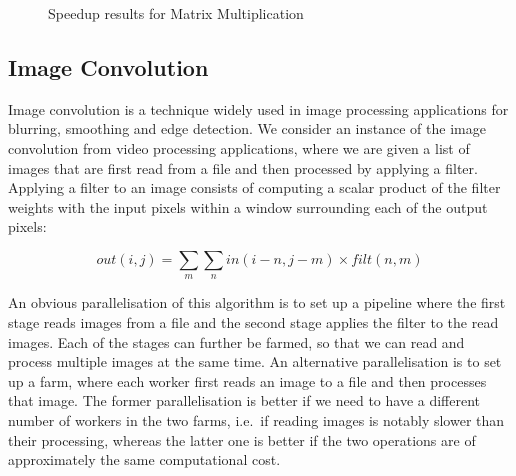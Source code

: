 \begin{figure}[t]
  \centering
{}
 \caption{Speedup results for Matrix Multiplication}
\label{fig:matmult_results}
\end{figure}


\subsection{Image Convolution}

Image convolution is a technique widely used in image processing applications for
blurring, smoothing and edge detection. We consider an instance of the image
convolution from video processing applications, where we are given a list of images
that are first read from a file and then processed by applying 
a filter. Applying a filter to an image consists of computing a scalar
product of the filter weights with the input pixels within a window surrounding each of
the output pixels:


\begin{equation}\label{eqn:01}
\textit{out}(i,j)=\sum_{m}\sum_{n} \textit{in}(i-n,j-m)\times \textit{filt}(n,m)
\end{equation}

\noindent
An obvious parallelisation of this algorithm is to set up a pipeline where the first stage reads images from a file and the second stage applies the filter to the read images. Each of the stages can further be farmed, so that we can read and process multiple images at the same time. An alternative parallelisation is to set up a farm, where each worker first reads an image to a file and then processes that image. The former parallelisation is better if we need to have a different number of workers in the two farms, i.e.~if reading images is notably slower than their processing, whereas the latter one is better if the two operations are of approximately the same computational cost.

